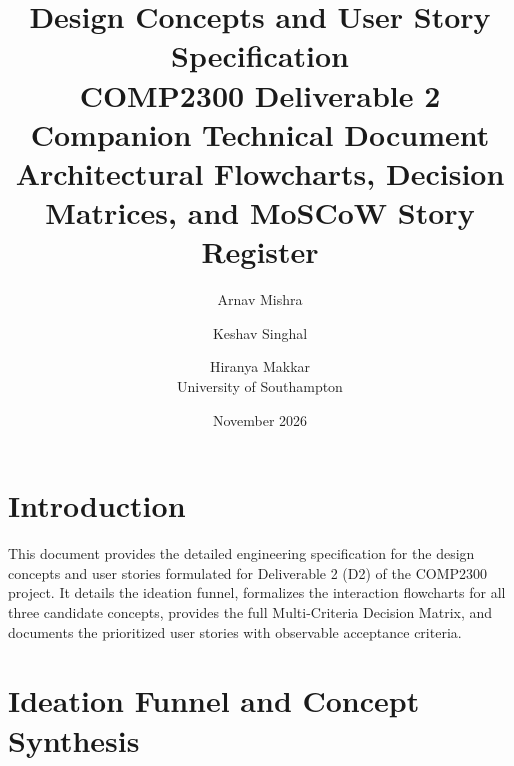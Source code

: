 \documentclass[12pt,a4paper]{article}
\title{\textbf{Design Concepts and User Story Specification}\\[0.4em]
  \large COMP2300 Deliverable 2 Companion Technical Document\\
  \normalsize Architectural Flowcharts, Decision Matrices, and MoSCoW Story Register}
\author{Arnav Mishra \and Keshav Singhal \and Hiranya Makkar\\[0.4em]
  \small University of Southampton}
\date{November 2026}
\begin{document}
\maketitle

\section{Introduction}
This document provides the detailed engineering specification for the design concepts and user stories formulated for Deliverable 2 (D2) of the COMP2300 project. It details the ideation funnel, formalizes the interaction flowcharts for all three candidate concepts, provides the full Multi-Criteria Decision Matrix, and documents the prioritized user stories with observable acceptance criteria.

\section{Ideation Funnel and Concept Synthesis}
\end{document}
